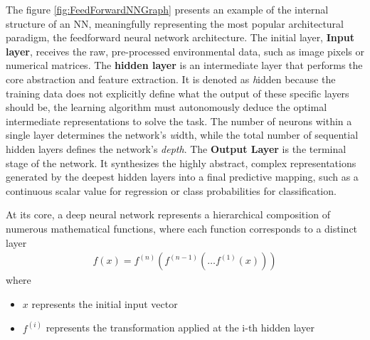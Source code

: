 The figure \ref{fig:FeedForwardNNGraph} presents an example of the internal structure of an NN, meaningfully representing the most popular architectural paradigm, the feedforward neural network architecture. The initial layer, {\bf Input layer}, receives the raw, pre-processed environmental data, such as image pixels or numerical matrices. The {\bf hidden layer} is an intermediate layer that performs the core abstraction and feature extraction. It is denoted as {\textit hidden} because the training data does not explicitly define what the output of these specific layers should be, the learning algorithm must autonomously deduce the optimal intermediate representations to solve the task. The number of neurons within a single layer determines the network's {\textit width}, while the total number of sequential hidden layers defines the network's \textit{ depth}. 
 The {\bf Output Layer} is the terminal stage of the network.
 It synthesizes the highly abstract, complex representations generated by the deepest hidden layers into a final predictive mapping, such as a continuous scalar value for regression or class probabilities for classification. \cite{Deep-Learning-book}

 At its core, a deep neural network represents a hierarchical composition of numerous mathematical functions, where each function corresponds to a distinct layer
 \begin{align}
f(x) = f^{(n)}(f^{(n-1)}(\dots f^{(1)}(x)))
\end{align}
where
\begin{itemize}
	\item $x$  represents the initial input vector
	\item $f^{(i)}$ represents the transformation applied at the i-th hidden layer
\end{itemize}


